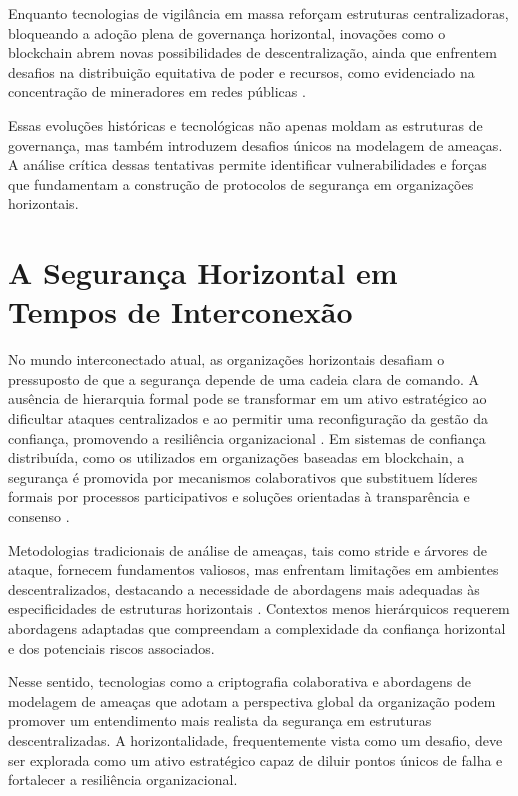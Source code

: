 Enquanto tecnologias de vigilância em massa reforçam estruturas
centralizadoras, bloqueando a adoção plena de governança horizontal,
inovações como o blockchain abrem novas possibilidades de descentralização,
ainda que enfrentem desafios na distribuição equitativa de poder e
recursos, como evidenciado na concentração de mineradores em redes públicas
\cite{DoArtifactsHavePolitics}.

Essas evoluções históricas e tecnológicas não apenas moldam as estruturas
de governança, mas também introduzem desafios únicos na modelagem de
ameaças. A análise crítica dessas tentativas permite identificar
vulnerabilidades e forças que fundamentam a construção de protocolos de
segurança em organizações horizontais.

\section{A Segurança Horizontal em Tempos de Interconexão}
\label{sec:desafios_contemporaneos}

No mundo interconectado atual, as organizações horizontais desafiam o
pressuposto de que a segurança depende de uma cadeia clara de comando. A
ausência de hierarquia formal pode se transformar em um ativo estratégico
ao dificultar ataques centralizados e ao permitir uma reconfiguração da
gestão da confiança, promovendo a resiliência organizacional
\cite{EverydayRevolutions}. Em sistemas de confiança distribuída,
como os utilizados em organizações baseadas em blockchain,
a segurança é promovida por mecanismos colaborativos que
substituem líderes formais por processos participativos e soluções
orientadas à transparência e consenso \cite{Reputation-basedDAO}.

Metodologias tradicionais de análise de ameaças, tais como \gls{stride} e árvores
de ataque, fornecem fundamentos valiosos, mas enfrentam limitações em
ambientes descentralizados, destacando a necessidade de abordagens mais
adequadas às especificidades de estruturas horizontais
\cite{ThreatModellingSurvey}. Contextos menos hierárquicos requerem
abordagens adaptadas que compreendam a complexidade da confiança horizontal
e dos potenciais riscos associados.

Nesse sentido, tecnologias como a criptografia colaborativa \cite{Colbac,
AbcCrypto} e abordagens de modelagem de ameaças que adotam a perspectiva global
da organização podem promover um entendimento mais realista da segurança em
estruturas descentralizadas. A horizontalidade, frequentemente vista como
um desafio, deve ser explorada como um ativo estratégico capaz de diluir
pontos únicos de falha e fortalecer a resiliência organizacional.

